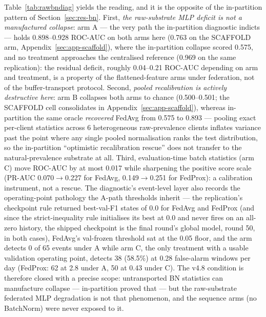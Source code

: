 Table~\ref{tab:rawbndiag} yields the reading, and it is the opposite
of the in-partition pattern of Section~\ref{sec:res-bn}. First,
\emph{the raw-substrate MLP deficit is not a manufactured collapse}:
arm A --- the very path the in-partition diagnostic indicts --- holds
0.898--0.928 ROC-AUC on both arms here (0.763 on the SCAFFOLD arm,
Appendix~\ref{sec:app-scaffold}), where the in-partition
collapse scored 0.575, and no treatment approaches the centralised
reference (0.969 on the same replication): the residual deficit,
roughly 0.04--0.21 ROC-AUC depending on arm and treatment, is a
property of the flattened-feature arms under federation, not of the
buffer-transport protocol. Second, \emph{pooled recalibration is
actively destructive here}: arm B collapses both arms to chance
(0.500--0.501; the SCAFFOLD cell consolidates in
Appendix~\ref{sec:app-scaffold}), whereas in-partition the same
oracle \emph{recovered}
FedAvg from 0.575 to 0.893 --- pooling exact per-client statistics
across 6 heterogeneous raw-prevalence clients inflates variance past
the point where any single pooled normalisation ranks the test
distribution, so the in-partition ``optimistic recalibration rescue''
does not transfer to the natural-prevalence substrate at all. Third,
evaluation-time batch statistics (arm C) move ROC-AUC by at most
0.017 while sharpening the positive score scale (PR-AUC
0.070$\to$0.227 for FedAvg, 0.149$\to$0.251 for FedProx): a
calibration instrument, not a rescue. The diagnostic's event-level
layer also records the operating-point pathology the A-path
thresholds inherit --- the replication's checkpoint rule returned
best-val-F1 states of 0.0 for FedAvg and FedProx (and since the
strict-inequality rule initialises its best at 0.0 and never fires on
an all-zero history, the shipped checkpoint is the final round's
global model, round 50, in both cases), FedAvg's val-frozen
threshold sat at the 0.05 floor, and the arm detects 0 of 65 events
under A while arm C, the only treatment with a usable validation
operating point, detects 38 (58.5\%) at 0.28 false-alarm windows per
day (FedProx: 62 at 2.8 under A, 50 at 0.43 under C). The v4.8
condition is therefore closed with a precise scope: untransported BN
statistics can manufacture collapse --- in-partition proved that ---
but the raw-substrate federated MLP degradation is not that
phenomenon, and the sequence arms (no BatchNorm) were never exposed
to it.

